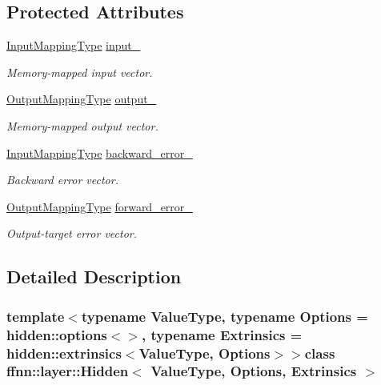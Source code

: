 \subsection*{Protected Attributes}
\begin{DoxyCompactItemize}
\item 
\hyperlink{classffnn_1_1layer_1_1_hidden_ac518f2e2be1250c1af7b2f8574cadc8d}{Input\-Mapping\-Type} \hyperlink{classffnn_1_1layer_1_1_hidden_afe2644f671f711cf0ca1357621dfc3a6}{input\-\_\-}
\begin{DoxyCompactList}\small\item\em Memory-\/mapped input vector. \end{DoxyCompactList}\item 
\hyperlink{classffnn_1_1layer_1_1_hidden_a9d882e035c7cd80ccd9b58fbe832591e}{Output\-Mapping\-Type} \hyperlink{classffnn_1_1layer_1_1_hidden_a118c5ecea99dc243573c981f26d53fc6}{output\-\_\-}
\begin{DoxyCompactList}\small\item\em Memory-\/mapped output vector. \end{DoxyCompactList}\item 
\hyperlink{classffnn_1_1layer_1_1_hidden_ac518f2e2be1250c1af7b2f8574cadc8d}{Input\-Mapping\-Type} \hyperlink{classffnn_1_1layer_1_1_hidden_ac4d0ae165b9c65ba0c156643962c866b}{backward\-\_\-error\-\_\-}
\begin{DoxyCompactList}\small\item\em Backward error vector. \end{DoxyCompactList}\item 
\hyperlink{classffnn_1_1layer_1_1_hidden_a9d882e035c7cd80ccd9b58fbe832591e}{Output\-Mapping\-Type} \hyperlink{classffnn_1_1layer_1_1_hidden_a1abba7440bdde56f49673de2acf58b30}{forward\-\_\-error\-\_\-}
\begin{DoxyCompactList}\small\item\em Output-\/target error vector. \end{DoxyCompactList}\end{DoxyCompactItemize}


\subsection{Detailed Description}
\subsubsection*{template$<$typename Value\-Type, typename Options = hidden\-::options$<$$>$, typename Extrinsics = hidden\-::extrinsics$<$\-Value\-Type, Options$>$$>$class ffnn\-::layer\-::\-Hidden$<$ Value\-Type, Options, Extrinsics $>$}

